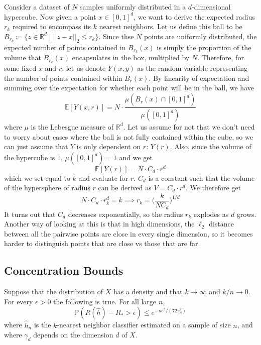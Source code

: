   \begin{example}
    Consider a dataset of $N$ samples uniformly distributed in a $d$-dimensional hypercube. Now given a point $x \in [0, 1]^d$, we want to derive the expected radius $r_k$ required to encompass its $k$ nearest neighbors. Let us define this ball to be $B_{r_k} \coloneqq \{ z \in \mathbb{R}^d \mid ||z - x ||_2 \leq r_k \}$. Since thse $N$ points are uniformly distributed, the expected number of points contained in $B_{r_k} (x)$ is simply the proportion of the volume that $B_{r_k} (x)$ encapsulates in the box, multiplied by $N$. Therefore, for some fixed $x$ and $r$, let us denote $Y(x, y)$ as the random variable representing the number of points contained within $B_r (x)$. By linearity of expectation and summing over the expectation for whether each point will be in the ball, we have 
    \[\mathbb{E}[Y (x, r)] = N \cdot \frac{\mu(B_r (x) \cap [0, 1]^d) }{\mu([0, 1]^d)}\]
    where $\mu$ is the Lebesgue measure of $\mathbb{R}^d$. Let us assume for not that we don't need to worry about cases where the ball is not fully contained within the cube, so we can just assume that $Y$ is only dependent on $r$: $Y(r)$. Also, since the volume of the hypercube is $1$,  $\mu([0, 1]^d) = 1$ and we get 
    \[\mathbb{E}[Y(r)] = N \cdot C_d \cdot r^d\]
    which we set equal to $k$ and evaluate for $r$. $C_d$ is a constant such that the volume of the hypersphere of radius $r$ can be derived as $V = C_d \cdot r^d$. We therefore get 
    \[N \cdot C_d \cdot r_k^d = k \implies r_k = \bigg( \frac{k}{N C_d} \bigg)^{1/d}\]
    It turns out that $C_d$ decreases exponentially, so the radius $r_k$ explodes as $d$ grows. Another way of looking at this is that in high dimensions, the $\ell_2$ distance between all the pairwise points are close in every single dimension, so it becomes harder to distinguish points that are close vs those that are far.  
  \end{example} 

\subsection{Concentration Bounds} 

  \begin{theorem}
    Suppose that the distribution of $X$ has a density and that $k \to \infty$ and $k/n \to 0$. For every $\epsilon > 0$ the following is true. For all large $n$,
    \begin{equation}
      \mathbb{P}(R(\hat{h}) - R_* > \epsilon) \leq e^{-n\epsilon^2/(72\gamma_d^2)}
    \end{equation}
    where $\hat{h}_n$ is the $k$-nearest neighbor classifier estimated on a sample of size $n$, and where $\gamma_d$ depends on the dimension $d$ of $X$.
  \end{theorem}

